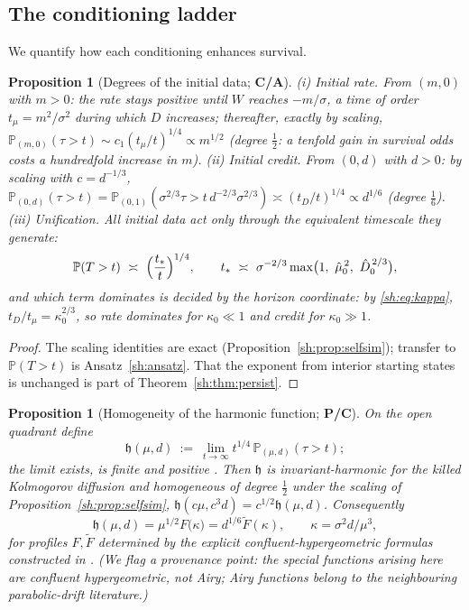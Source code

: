 \documentclass[11pt]{article}
\numberwithin{equation}{section}
\theoremstyle{plain}
\newtheorem{proposition}[theorem]{Proposition}
\theoremstyle{definition}
\theoremstyle{remark}
\newcommand{\PP}{\mathbb{P}}
\newcommand{\hm}{\mathfrak{h}}
\begin{document}
\subsection{The conditioning ladder}\label{sh:subsub:ladder}

We quantify how each conditioning enhances survival.

\begin{proposition}[Degrees of the initial data; \textbf{C/A}]
\label{sh:prop:degrees}
\emph{(i) Initial rate.} From $(m,0)$ with $m>0$: the rate stays positive
until $W$ reaches $-m/\sigma$, a time of order $t_\mu=m^2/\sigma^2$ during
which $D$ increases; thereafter, exactly by scaling,
$\PP_{(m,0)}(\tau>t)\sim c_1(t_\mu/t)^{1/4}\propto m^{1/2}$
\emph{(degree $\tfrac12$: a tenfold gain in survival odds costs a
hundredfold increase in $m$)}.
\emph{(ii) Initial credit.} From $(0,d)$ with $d>0$: by scaling with
$c=d^{-1/3}$, $\PP_{(0,d)}(\tau>t)=\PP_{(0,1)}(\sigma^{2/3}\tau>
t\,d^{-2/3}\sigma^{2/3})\asymp(t_D/t)^{1/4}\propto d^{1/6}$
\emph{(degree $\tfrac16$)}.
\emph{(iii) Unification.} All initial data act only through the equivalent
timescale they generate:
\begin{equation}\label{sh:eq:tstar}
\PP(T>t)\ \asymp\ \Bigl(\frac{t_*}{t}\Bigr)^{1/4},\qquad
t_*\ \asymp\ \sigma^{-2/3}\max\bigl(1,\ \hat\mu_0^{\,2},\ \hat
D_0^{\,2/3}\bigr),
\end{equation}
and which term dominates is decided by the horizon coordinate: by
\eqref{sh:eq:kappa}, $t_D/t_\mu=\kappa_0^{2/3}$, so rate dominates for
$\kappa_0\ll1$ and credit for $\kappa_0\gg1$.
\end{proposition}

\begin{proof}
The scaling identities are exact (Proposition~\ref{sh:prop:selfsim});
transfer to $\PP(T>t)$ is Ansatz~\ref{sh:ansatz}. That the exponent from
interior starting states is unchanged is part of
Theorem~\ref{sh:thm:persist}.
\end{proof}

\begin{proposition}[Homogeneity of the harmonic function; \textbf{P/C}]
\label{sh:prop:harmonic}
On the open quadrant define
\[
\hm(\mu,d)\ :=\ \lim_{t\to\infty}t^{1/4}\,\PP_{(\mu,d)}(\tau>t);
\]
the limit exists, is finite and positive \cite{IW94,GJW99}. Then $\hm$ is
invariant-harmonic for the killed Kolmogorov diffusion and homogeneous of
degree $\tfrac12$ under the scaling of
Proposition~\ref{sh:prop:selfsim}, $\hm(c\mu,c^3d)=c^{1/2}\hm(\mu,d)$.
Consequently
\begin{equation}\label{sh:eq:harm}
\hm(\mu,d)=\mu^{1/2}F\bigl(\kappa\bigr)=d^{1/6}\tilde F(\kappa),
\qquad \kappa=\sigma^2d/\mu^3,
\end{equation}
for profiles $F,\tilde F$ determined by the explicit
confluent-hypergeometric formulas constructed in \cite{GJW99}. (We flag
a provenance point: the special functions arising here are confluent
hypergeometric, not Airy; Airy functions belong to the neighbouring
parabolic-drift literature.)
\end{proposition}
\end{document}
